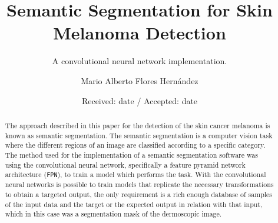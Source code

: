 \title{Semantic Segmentation for Skin Melanoma Detection%
}
\subtitle{A convolutional neural network implementation.}


\author{Mario Alberto Flores Hernández}


\date{Received: date / Accepted: date}


\maketitle

\begin{abstract}
  The approach described in this paper for the detection of the skin cancer melanoma is known as semantic segmentation. The semantic segmentation is a computer vision task where the different regions of an image are classified according to a specific category. The method used for the implementation of a semantic segmentation software was using the convolutional neural network, specifically a feature pyramid network architecture (\texttt{FPN}), to train a model which performs the task. With the convolutional neural networks is possible to train models that replicate the necessary transformations to obtain a targeted output, the only requirement is a rich enough database of samples of the input data and the target or the expected output in relation with that input, which in this case was a segmentation mask of the dermoscopic image.

\end{abstract}

